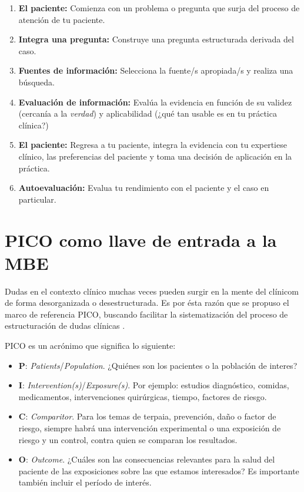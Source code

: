 \documentclass[]{book}
\providecommand{\tightlist}{%
  \setlength{\itemsep}{0pt}\setlength{\parskip}{0pt}}
\begin{document}
\begin{enumerate}
\def\labelenumi{\arabic{enumi}.}
\tightlist
\item
  \textbf{El paciente:} Comienza con un problema o pregunta que surja del proceso de atención de tu paciente.
\item
  \textbf{Integra una pregunta:} Construye una pregunta estructurada derivada del caso.
\item
  \textbf{Fuentes de información:} Selecciona la fuente/s apropiada/s y realiza una búsqueda.
\item
  \textbf{Evaluación de información:} Evalúa la evidencia en función de su validez (cercanía a la \emph{verdad}) y aplicabilidad (¿qué tan usable es en tu práctica clínica?)
\item
  \textbf{El paciente:} Regresa a tu paciente, integra la evidencia con tu expertiese clínico, las preferencias del paciente y toma una decisión de aplicación en la práctica.
\item
  \textbf{Autoevaluación:} Evalua tu rendimiento con el paciente y el caso en particular.
\end{enumerate}

\hypertarget{pico}{%
\chapter{PICO como llave de entrada a la MBE}\label{pico}}

Dudas en el contexto clínico muchas veces pueden surgir en la mente del clínicom de forma desorganizada o desestructurada. Es por ésta razón que se propuso el marco de referencia PICO, buscando facilitar la sistematización del proceso de estructuración de dudas clínicas \citep{richardson1995well}.

PICO es un acrónimo que significa lo siguiente:

\begin{itemize}
\tightlist
\item
  \textbf{P}: \emph{Patients}/\emph{Population}. ¿Quiénes son los pacientes o la población de interes?
\item
  \textbf{I}: \emph{Intervention(s)}/\emph{Exposure(s)}. Por ejemplo: estudios diagnóstico, comidas, medicamentos, intervenciones quirúrgicas, tiempo, factores de riesgo.
\item
  \textbf{C}: \emph{Comparitor}. Para los temas de terpaia, prevención, daño o factor de riesgo, siempre habrá una intervención experimental o una exposición de riesgo y un control, contra quien se comparan los resultados.
\item
  \textbf{O}: \emph{Outcome}. ¿Cuáles son las consecuencias relevantes para la salud del paciente de las exposiciones sobre las que estamos interesados? Es importante también incluir el período de interés.
\end{itemize}
\end{document}
